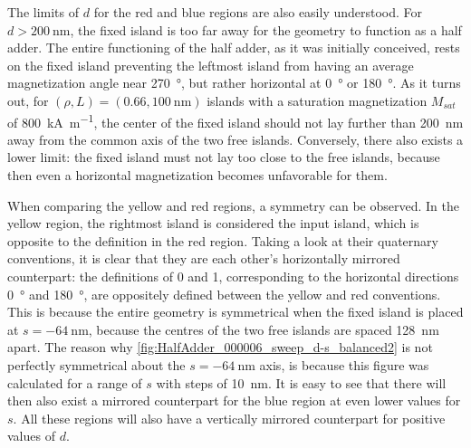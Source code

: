 \documentclass[11pt,a4paper,english]{article}
\begin{document}
The limits of $d$ for the red and blue regions are also easily understood. For $d>\SI{200}{\nano\metre}$, the fixed island is too far away for the geometry to function as a half adder. The entire functioning of the half adder, as it was initially conceived, rests on the fixed island preventing the leftmost island from having an average magnetization angle near \SI{270}{\degree}, but rather horizontal at \SI{0}{\degree} or \SI{180}{\degree}. As it turns out, for $(\rho, L) = (0.66,\SI{100}{\nano\metre})$ islands with a saturation magnetization $M_{sat}$ of \SI{800}{\kilo\ampere\per\metre}, the center of the fixed island should not lay further than \SI{200}{\nano\metre} away from the common axis of the two free islands. Conversely, there also exists a lower limit: the fixed island must not lay too close to the free islands, because then even a horizontal magnetization becomes unfavorable for them. \par
When comparing the yellow and red regions, a symmetry can be observed. In the yellow region, the rightmost island is considered the input island, which is opposite to the definition in the red region. Taking a look at their quaternary conventions, it is clear that they are each other's horizontally mirrored counterpart: the definitions of 0 and 1, corresponding to the horizontal directions \SI{0}{\degree} and \SI{180}{\degree}, are oppositely defined between the yellow and red conventions. This is because the entire geometry is symmetrical when the fixed island is placed at $s=\SI{-64}{\nano\metre}$, because the centres of the two free islands are spaced \SI{128}{\nano\metre} apart. The reason why \cref{fig:HalfAdder_000006_sweep_d-s_balanced2} is not perfectly symmetrical about the $s=\SI{-64}{\nano\metre}$ axis, is because this figure was calculated for a range of $s$ with steps of \SI{10}{\nano\metre}. It is easy to see that there will then also exist a mirrored counterpart for the blue region at even lower values for $s$. All these regions will also have a vertically mirrored counterpart for positive values of $d$. \par
\end{document}
